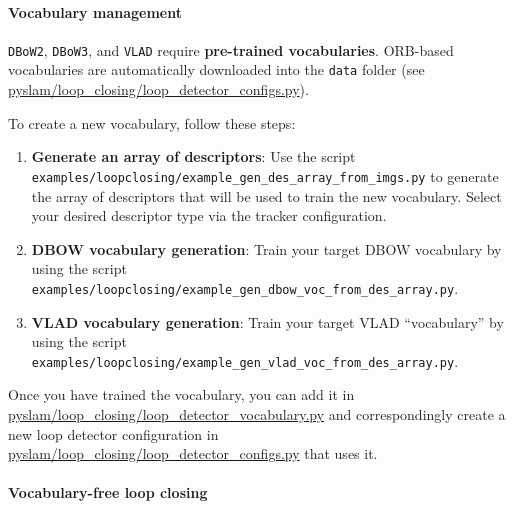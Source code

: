 \documentclass{article}
\let\oldparagraph\paragraph
\renewcommand{\paragraph}[1]{\oldparagraph{#1}\mbox{}}
\begin{document}
\hypertarget{vocabulary-management}{%
\paragraph{Vocabulary management}\label{vocabulary-management}}

\texttt{DBoW2}, \texttt{DBoW3}, and \texttt{VLAD} require
\textbf{pre-trained vocabularies}. ORB-based vocabularies are
automatically downloaded into the \texttt{data} folder (see
\href{https://github.com/luigifreda/pyslam/blob/master/pyslam/loop_closing/loop_detector_configs.py}{pyslam/loop\_closing/loop\_detector\_configs.py}).

To create a new vocabulary, follow these steps:

\begin{enumerate}
\def\labelenumi{\arabic{enumi}.}
\item
  \textbf{Generate an array of descriptors}: Use the script \\
  \texttt{examples/loopclosing/example\_gen\_des\_array\_from\_imgs.py} to
  generate the array of descriptors that will be used to train the new
  vocabulary. Select your desired descriptor type via the tracker
  configuration.
\item
  \textbf{DBOW vocabulary generation}: Train your target DBOW vocabulary
  by using the script
  \texttt{examples/loopclosing/example\_gen\_dbow\_voc\_from\_des\_array.py}.
\item
  \textbf{VLAD vocabulary generation}: Train your target VLAD
  ``vocabulary'' by using the script
  \texttt{examples/loopclosing/example\_gen\_vlad\_voc\_from\_des\_array.py}.
\end{enumerate}

Once you have trained the vocabulary, you can add it in
\href{https://github.com/luigifreda/pyslam/blob/master/pyslam/loop_closing/loop_detector_vocabulary.py}{pyslam/loop\_closing/loop\_detector\_vocabulary.py} and correspondingly
create a new loop detector configuration in
\href{https://github.com/luigifreda/pyslam/blob/master/pyslam/loop_closing/loop_detector_configs.py}{pyslam/loop\_closing/loop\_detector\_configs.py} that uses it.

\hypertarget{vocabulary-free-loop-closing}{%
\paragraph{Vocabulary-free loop
closing}\label{vocabulary-free-loop-closing}}
\end{document}

